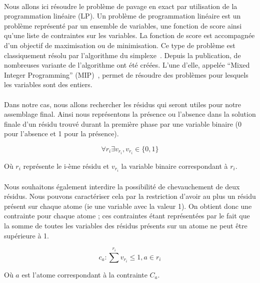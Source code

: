 \documentclass[12pt,french,twoside]{report}
\begin{document}
\paragraph{}Nous allons ici résoudre le problème de pavage en exact par utilisation de la programmation linéaire (LP). Un
problème de programmation linéaire est un
problème représenté par un ensemble de variables, une fonction de score ainsi qu'une liste de contraintes sur les variables. La
fonction de score est accompagnée d'un objectif de maximisation ou de minimisation. Ce type de problème est classiquement résolu
par l'algorithme du simplexe~\cite{murty_linear_1983}. Depuis la publication, de nombreuses variante de l'algorithme ont été
créées. L'une d'elle, appelée ``Mixed Integer Programming'' (MIP)~\cite{wolsey_mixed_2007}, permet de résoudre des problèmes
pour lesquels les variables sont des entiers.

\paragraph{}Dans notre cas, nous allons rechercher les résidus qui seront utiles pour notre assemblage final.
Ainsi nous représentons la présence ou l'absence dans la solution finale d'un résidu trouvé durant la première phase par une
variable binaire (0 pour l'absence et 1 pour la présence).

\begin{equation}
 \forall r_i \exists v_{r_i}, v_{r_i} \in \{0, 1\}
\end{equation}

Où $r_i$ représente le i-ème résidu et $v_{r_i}$ la variable binaire correspondant à $r_i$.

\paragraph{}Nous souhaitons également interdire la possibilité de chevauchement de deux résidus. Nous pouvons caractériser cela
par la restriction d'avoir au plus un résidu présent sur chaque atome (ie une variable avec la valeur 1). On obtient donc une
contrainte pour chaque atome ; ces contraintes étant
représentées par le fait que la somme de toutes les variables des résidus présents sur un atome ne peut être supérieure à 1.

\begin{equation}
 c_a : \sum^{r_i} v_{r_i} \leqslant 1, a \in r_i
\end{equation}

Où $a$ est l'atome correspondant à la contrainte $C_a$.
\end{document}
